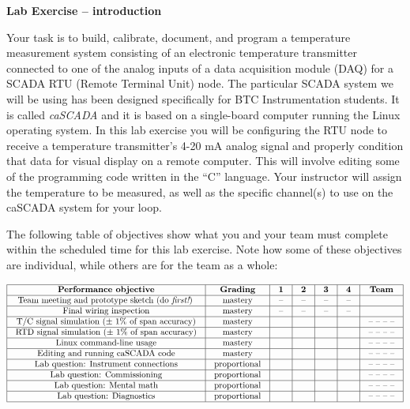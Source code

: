 \documentclass[12pt,a4paper]{article}
\begin{document}
\begin{itemize}
\noindent
{\bf Lab Exercise -- introduction}

\vskip 5pt

Your task is to build, calibrate, document, and program a temperature measurement system consisting of an electronic temperature transmitter connected to one of the analog inputs of a data acquisition module (DAQ) for a SCADA RTU (Remote Terminal Unit) node.  The particular SCADA system we will be using has been designed specifically for BTC Instrumentation students.  It is called {\sl caSCADA} and it is based on a single-board computer running the Linux operating system.  In this lab exercise you will be configuring the RTU node to receive a temperature transmitter's 4-20 mA analog signal and properly condition that data for visual display on a remote computer.  This will involve editing some of the programming code written in the ``C'' language.  Your instructor will assign the temperature to be measured, as well as the specific channel(s) to use on the caSCADA system for your loop.

The following table of objectives show what you and your team must complete within the scheduled time for this lab exercise.  Note how some of these objectives are individual, while others are for the team as a whole:



$$\vbox{\offinterlineskip
\halign{\strut
\vrule \quad\hfil # \ \hfil & 
\vrule \quad\hfil # \ \hfil & 
\vrule \quad\hfil # \ \hfil & 
\vrule \quad\hfil # \ \hfil & 
\vrule \quad\hfil # \ \hfil & 
\vrule \quad\hfil # \ \hfil & 
\vrule \quad\hfil # \ \hfil \vrule \cr
\noalign{\hrule}
%
{\bf Performance objective} & {\bf Grading} & {\bf 1} & {\bf 2} & {\bf 3} & {\bf 4} & {\bf Team} \cr
%
\noalign{\hrule}
%
Team meeting and prototype sketch (do {\it first!}) & mastery & -- & -- & -- & -- & \cr
%
\noalign{\hrule}
%
Final wiring inspection & mastery & -- & -- & -- & -- &  \cr
%
\noalign{\hrule}
%
T/C signal simulation ($\pm$ 1\% of span accuracy) & mastery &  &  &  &  & -- -- -- -- \cr
%
\noalign{\hrule}
%
RTD signal simulation ($\pm$ 1\% of span accuracy) & mastery &  &  &  &  & -- -- -- -- \cr
%
\noalign{\hrule}
%
Linux command-line usage & mastery &  &  &  &  & -- -- -- -- \cr
%
\noalign{\hrule}
%
Editing and running caSCADA code & mastery &  &  &  &  & -- -- -- -- \cr
%
\noalign{\hrule}
%
Lab question: Instrument connections & proportional &  &  &  &  & -- -- -- -- \cr
%
\noalign{\hrule}
%
Lab question: Commissioning & proportional &  &  &  &  & -- -- -- -- \cr
%
\noalign{\hrule}
%
Lab question: Mental math & proportional &  &  &  &  & -- -- -- -- \cr
%
\noalign{\hrule}
%
Lab question: Diagnostics & proportional &  &  &  &  & -- -- -- -- \cr
%
\noalign{\hrule}
} %
}$$ %


\end{itemize}
\end{document}
